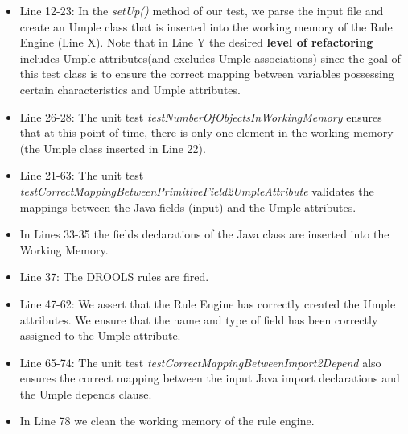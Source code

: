 \begin{itemize}
\item Line 12-23: In the \textit{setUp()} method of our test, we parse the input file and create an Umple class that is inserted into the working memory of the Rule Engine (Line X). Note that in Line Y  the desired \textbf{level of refactoring} includes Umple attributes(and excludes Umple associations) since the goal of this test class is to ensure the correct mapping between variables possessing certain characteristics and Umple attributes.


\item Line 26-28: The unit test \textit{testNumberOfObjectsInWorkingMemory} ensures that at this point of time, there is only one element in the working memory (the Umple class inserted in Line 22).

\item Line 21-63: The unit test \textit{testCorrectMappingBetweenPrimitiveField2UmpleAttribute} validates the mappings between the Java fields (input) and the Umple attributes. 

\item In Lines 33-35 the fields declarations of the Java class are inserted into the Working Memory. 

\item Line 37: The DROOLS rules are fired. 

\item Line 47-62: We assert that the Rule Engine has correctly created the Umple attributes. We ensure that the name and type of field has been correctly assigned to the Umple attribute.

\item Line 65-74: The unit test \textit{testCorrectMappingBetweenImport2Depend} also ensures the correct mapping between the input Java import declarations and the Umple depends clause.

\item In Line 78 we clean the working memory of the rule engine.
\end{itemize}


